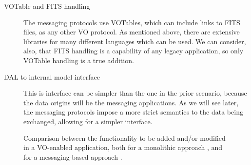 \begin{description}
\begin{description}
				\item[VOTable and FITS handling] The messaging
				protocols use VOTables, which can include links to
				FITS files, as any other VO protocol. As mentioned
				above, there are extensive libraries for many
				different languages which can be used. We can
				consider, also, that FITS handling is a capability
				of any legacy application, so only VOTable handling
				is a true addition.
				
				\item[DAL to internal model interface] This is
				interface can be simpler than the one in the prior
				scenario, because the data origins will be the
				messaging applications. As we will see later, the
				messaging protocols impose a more strict semantics
				to the data being exchanged, allowing for a simpler
				interface.
			\end{description} 
		\end{description}
		
		
		\begin{figure}[tbp]
			\centering
			\vfill
			\caption[Modules for monolithic a message-based VO-enabled
			applications]
			{
				Comparison between the functionality to be added
				and/or modified in a VO-enabled application, both
				for a monolithic approach
				, and for a
				messaging-based approach
				.
			}
			\label{fig:monolithic_vs_modular_VO_capabilities}
		\end{figure}
		
